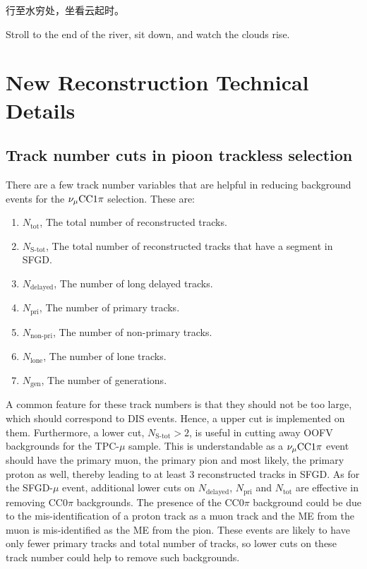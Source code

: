 \begin{savequote}[8cm]
\begin{CJK*}{UTF8}{gbsn}
  行至水穷处，坐看云起时。
\end{CJK*}

Stroll to the end of the river, sit down, and watch the clouds rise.

\end{savequote}

\chapter{\label{app:newtech}New Reconstruction Technical Details}

\minitoc

\section{Track number cuts in pioon trackless selection}
\label{sec:app-tlpi-trknumcut}
There are a few track number variables that are helpful in reducing background events for the $\nu_{\mu}\textrm{CC}1\pi$ selection. 
These are:
\begin{enumerate}
    \item $N_{\textrm{tot}}$, The total number of reconstructed tracks.
    \item $N_{\textrm{S-tot}}$, The total number of reconstructed tracks that have a segment in SFGD.
    \item $N_{\textrm{delayed}}$, The number of long delayed tracks.
    \item $N_{\textrm{pri}}$, The number of primary tracks.
    \item $N_{\textrm{non-pri}}$, The number of non-primary tracks.
    \item $N_{\textrm{lone}}$, The number of lone tracks.
    \item $N_{\textrm{gen}}$, The number of generations.
\end{enumerate}
A common feature for these track numbers is that they should not be too large, which should correspond to DIS events.
Hence, a upper cut is implemented on them.
Furthermore, a lower cut, $N_{\textrm{S-tot}}>2$, is useful in cutting away OOFV backgrounds for the TPC-$\mu$ sample.
This is understandable as a $\nu_{\mu}\textrm{CC}1\pi$ event should have the primary muon, the primary pion and most likely, the primary proton as well, thereby leading to at least $3$ reconstructed tracks in SFGD.
As for the SFGD-$\mu$ event, additional lower cuts on  $N_{\textrm{delayed}}$, $N_{\textrm{pri}}$ and $N_{\textrm{tot}}$ are effective in removing CC$0\pi$ backgrounds.
The presence of the CC$0\pi$ background could be due to the mis-identification of a proton track as a muon track and the ME from the muon is mis-identified as the ME from the pion.
These events are likely to have only fewer primary tracks and total number of tracks, so lower cuts on these track number could help to remove such backgrounds.

